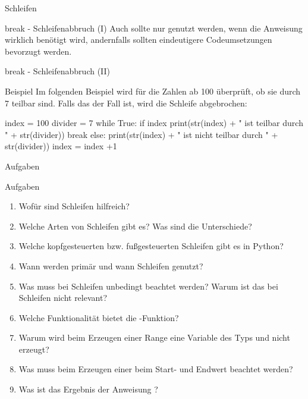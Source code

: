 \begin{subsection}{Schleifen}
\begin{frame}{break - Schleifenabbruch (I)}
            Auch  sollte nur genutzt werden, wenn die Anweisung wirklich benötigt wird, andernfalls sollten eindeutigere Codeumsetzungen bevorzugt werden.
        \end{frame}
        
        \begin{frame}[fragile]{break - Schleifenabbruch (II)}
            
            \begin{exampleblock}{Beispiel}
                Im folgenden Beispiel wird für die Zahlen ab 100 überprüft, ob sie durch 7 teilbar sind. Falls das der Fall ist, wird die Schleife abgebrochen:
                
\begin{pythoncode}
index = 100
divider = 7
while True:
    if index %
        print(str(index) + " ist teilbar durch " + str(divider))
        break
    else:
        print(str(index) + " ist nicht teilbar durch " + str(divider))
        index = index +1
\end{pythoncode}
            
            \end{exampleblock}
        \end{frame}

        \begin{subsubsection}{Aufgaben}
            \begin{frame}{Aufgaben}
                \begin{enumerate}
                    \item Wofür sind Schleifen hilfreich?
                    \item Welche Arten von Schleifen gibt es? Was sind die Unterschiede?
                    \item Welche kopfgesteuerten bzw. fußgesteuerten Schleifen gibt es in Python?
                    \item Wann werden primär  und wann  Schleifen genutzt?
                    \item Was muss bei  Schleifen unbedingt beachtet werden? Warum ist das bei  Schleifen nicht relevant?
                    
                    \item Welche Funktionalität bietet die -Funktion?
                    \item Warum wird beim Erzeugen einer Range eine Variable des Typs  und nicht  erzeugt?
                    \item Was muss beim Erzeugen einer  beim Start- und Endwert beachtet werden?
                    \item Was ist das Ergebnis der Anweisung ?
                    

\end{enumerate}
\end{frame}
\end{subsubsection}
\end{subsection}
